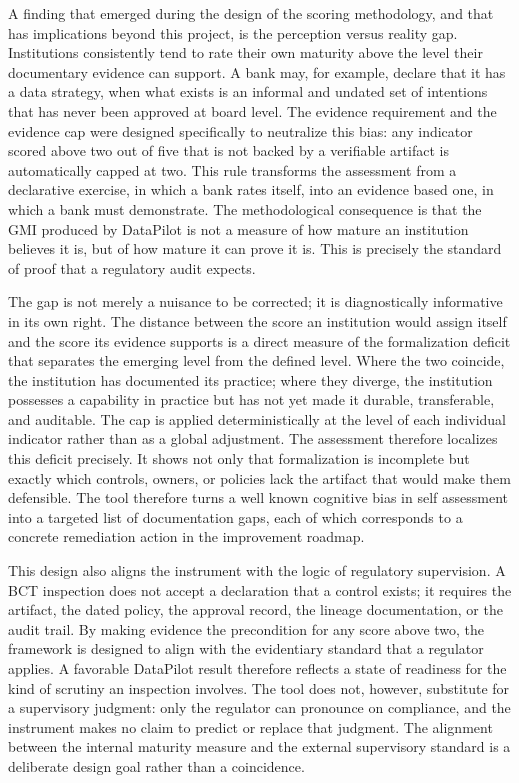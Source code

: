 A finding that emerged during the design of the scoring methodology, and that has implications beyond this project, is the perception versus reality gap. Institutions consistently tend to rate their own maturity above the level their documentary evidence can support. A bank may, for example, declare that it has a data strategy, when what exists is an informal and undated set of intentions that has never been approved at board level. The evidence requirement and the evidence cap were designed specifically to neutralize this bias: any indicator scored above two out of five that is not backed by a verifiable artifact is automatically capped at two. This rule transforms the assessment from a declarative exercise, in which a bank rates itself, into an evidence based one, in which a bank must demonstrate. The methodological consequence is that the GMI produced by DataPilot is not a measure of how mature an institution believes it is, but of how mature it can prove it is. This is precisely the standard of proof that a regulatory audit expects.

The gap is not merely a nuisance to be corrected; it is diagnostically informative in its own right. The distance between the score an institution would assign itself and the score its evidence supports is a direct measure of the formalization deficit that separates the emerging level from the defined level. Where the two coincide, the institution has documented its practice; where they diverge, the institution possesses a capability in practice but has not yet made it durable, transferable, and auditable. The cap is applied deterministically at the level of each individual indicator rather than as a global adjustment. The assessment therefore localizes this deficit precisely. It shows not only that formalization is incomplete but exactly which controls, owners, or policies lack the artifact that would make them defensible. The tool therefore turns a well known cognitive bias in self assessment into a targeted list of documentation gaps, each of which corresponds to a concrete remediation action in the improvement roadmap.

This design also aligns the instrument with the logic of regulatory supervision. A BCT inspection does not accept a declaration that a control exists; it requires the artifact, the dated policy, the approval record, the lineage documentation, or the audit trail. By making evidence the precondition for any score above two, the framework is designed to align with the evidentiary standard that a regulator applies. A favorable DataPilot result therefore reflects a state of readiness for the kind of scrutiny an inspection involves. The tool does not, however, substitute for a supervisory judgment: only the regulator can pronounce on compliance, and the instrument makes no claim to predict or replace that judgment. The alignment between the internal maturity measure and the external supervisory standard is a deliberate design goal rather than a coincidence.

